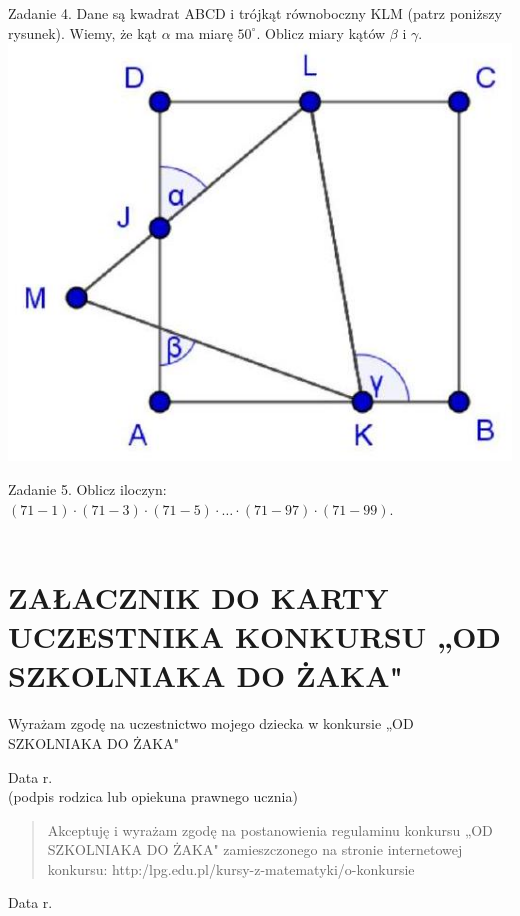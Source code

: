 \documentclass[10pt]{article}
\begin{document}
Zadanie 4. Dane są kwadrat ABCD i trójkąt równoboczny KLM (patrz poniższy rysunek). Wiemy, że kąt \(\alpha\) ma miarę \(50^{\circ}\). Oblicz miary kątów \(\beta\) i \(\gamma\).\\
\includegraphics[max width=\textwidth, center]{2024_11_21_dcd2fc8702c4ba725104g-1}

Zadanie 5. Oblicz iloczyn: \((71-1) \cdot(71-3) \cdot(71-5) \cdot \ldots \cdot(71-97) \cdot(71-99)\).\\
\(\qquad\)

\section*{ZAŁACZNIK DO KARTY UCZESTNIKA KONKURSU „OD SZKOLNIAKA DO ŻAKA" }
Wyrażam zgodę na uczestnictwo mojego dziecka w konkursie „OD SZKOLNIAKA DO ŻAKA"

Data r.\\
(podpis rodzica lub opiekuna prawnego ucznia)

\begin{abstract}
Akceptuję i wyrażam zgodę na postanowienia regulaminu konkursu „OD SZKOLNIAKA DO ŻAKA" zamieszczonego na stronie internetowej konkursu: http:/lpg.edu.pl/kursy-z-matematyki/o-konkursie
\end{abstract}

Data r.
\end{document}
